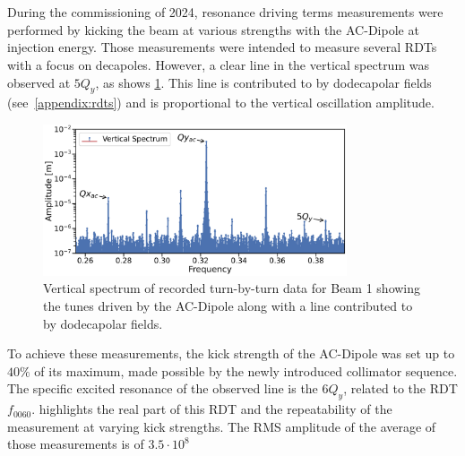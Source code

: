 \section{}


During the commissioning of 2024, resonance driving terms measurements were performed by kicking the
beam at various strengths with the AC-Dipole at injection energy. Those measurements were intended
to measure several RDTs with a focus on decapoles.
However, a clear line in the vertical spectrum was observed at $5Q_y$, as shows
\cref{fig:high_orders:spectrum_dodecapole_5qy}. This line is contributed to by dodecapolar fields
(see \cref{appendix:rdts}) and is proportional to the vertical oscillation amplitude.

\begin{figure}[!htb]
    \centering
    \includegraphics[width=0.8\textwidth]{./images/spectrum_dodecapole_5qy.pdf}
    \caption{Vertical spectrum of recorded turn-by-turn data for Beam 1 showing the tunes driven by the
    AC-Dipole along with a line contributed to by dodecapolar fields.}
    \label{fig:high_orders:spectrum_dodecapole_5qy}
\end{figure}

To achieve these measurements, the kick strength of the AC-Dipole was set up to $40\%$ of its
maximum, made possible by the newly introduced collimator sequence. The specific excited resonance
of the observed line is the $6Q_y$, related to the RDT $f_{0060}$.
 highlights the real part of this RDT and the repeatability
of the measurement at varying kick strengths. The RMS amplitude of the average of those measurements
is of $3.5\cdot10^8$

